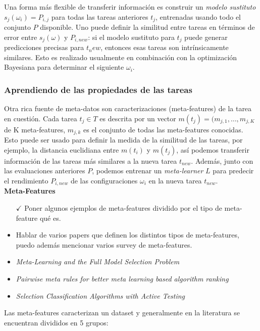Una forma más flexible de transferir información es construir un \textit{modelo sustituto} $s_j(\omega_i) = P_{i,j}$ para todas las tareas anteriores $t_j$, entrenadas usando todo el conjunto $P$ disponible. Uno puede definir la similitud entre tareas en términos de error entre $s_j(\omega)$ y $P_{i, new}$: si el modelo sustituto para $t_j$ puede generar predicciones precisas para $t_new$, entonces esas tareas son intrínsicamente similares. Esto es realizado usualmente en combinación con la optimización Bayesiana para determinar el siguiente $\omega_i$. 

\subsubsection{Aprendiendo de las propiedades de las tareas}

Otra rica fuente de meta-datos son caracterizaciones (meta-features) de la tarea en cuestión. Cada tarea $t_j \in T$ es descrita por un vector $m(t_j) = (m_{j,1}, …, m_{j,K}$ de K meta-features, $m_{j,k}$ es el conjunto de todas las meta-features conocidas. Esto puede ser usado para definir la medida de la similitud de las tareas, por ejemplo, la distancia euclidiana entre $m(t_i)$ y $m(t_j)$, así podemos transferir información de las tareas más similares a la nueva tarea $t_{new}$. Además, junto con las evaluaciones anteriores $P$, podemos entrenar un \emph{meta-learner} $L$ para predecir el rendimiento $P_{i, new}$ de las configuraciones $\omega_i$ en la nueva tarea $t_{new}$. \\

\textbf{Meta-Features}

\begin{itemize}
	\item[$\checkmark$] Poner algunos ejemplos de meta-features dividido por el tipo de meta-feature qué es.
	\item Hablar de varios papers que definen los distintos tipos de meta-features, puedo además mencionar varios survey de meta-features.
	\item \textit{Meta-Learning and the Full Model Selection Problem}
	\item \textit{Pairwise meta rules for better meta learning based algorithm ranking}
	\item \textit{Selection Classification Algorithms with Active Testing}
\end{itemize}

Las meta-features caracterizan un dataset y generalmente en la literatura se encuentran divididos en 5 grupos:


